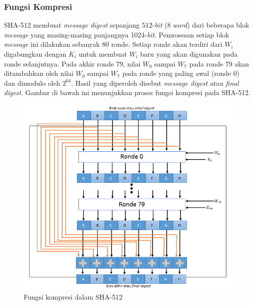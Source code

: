 \subsubsection{Fungsi Kompresi}
SHA-512 membuat \textit{message digest} sepanjang 512-\textit{bit} (8 \textit{word}) dari beberapa blok \textit{message} yang masing-masing panjangnya 1024-\textit{bit}. Pemrosesan setiap blok \textit{message} ini dilakukan sebanyak 80 ronde. Setiap ronde akan terdiri dari \begin{math}W_i\end{math} digabungkan dengan \begin{math}K_i\end{math} untuk membuat \begin{math}W_i\end{math} baru yang akan digunakan pada ronde selanjutnya. Pada akhir ronde 79, nilai \begin{math}W_0\end{math} sampai \begin{math}W_7\end{math} pada ronde 79 akan ditambahkan oleh nilai \begin{math}W_0\end{math} sampai \begin{math}W_7\end{math} pada ronde yang paling awal (ronde 0) dan dimodulo oleh \begin{math}2^{64}\end{math}. Hasil yang diperoleh disebut \textit{message digest} atau \textit{final digest}. Gambar di bawah ini menunjukkan proses fungsi kompresi pada SHA-512.

\begin{figure}[ht]
	\includegraphics[scale=0.8]{Gambar/compression_function}
	\centering
	\caption{Fungsi kompresi dalam SHA-512}
\end{figure}

